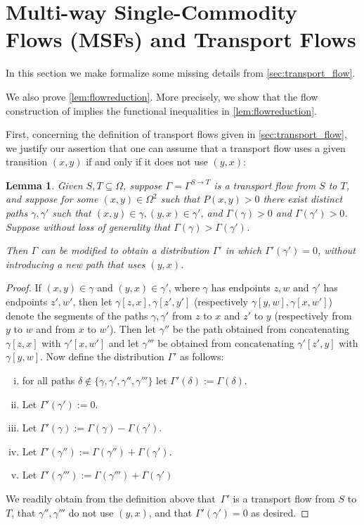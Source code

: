 \documentclass[a4paper, 12p]{article}
\numberwithin{equation}{section}
\newtheorem{lemma}[theorem]{Lemma}
\begin{document}
\printbibliography

\appendix

\section{Multi-way Single-Commodity Flows (MSFs) and Transport Flows}
\label{sec:msf}
In this section we make formalize some missing details from \cref{sec:transport_flow}.

We also prove \cref{lem:flowreduction}. More precisely, we show that the flow construction of \cite{eppstein2022improved} implies the functional inequalities in \cref{lem:flowreduction}.

First, concerning the definition of transport flows given in \cref{sec:transport_flow}, we justify our assertion that one can assume that a transport flow uses a given transition $(x, y)$ if and only if it does not use $(y, x)$:
\begin{lemma}
\label{lem:onedir}
Given $S, T \subseteq \Omega$, suppose $\Gamma = \Gamma^{S\rightarrow T}$ is a transport flow from $S$ to $T$, and suppose for some $(x, y) \in \Omega^2$ such that $P(x, y) > 0$ there exist distinct paths $\gamma, \gamma'$ such that $(x, y) \in \gamma, (y, x) \in \gamma'$, and $\Gamma(\gamma) > 0$ and $\Gamma(\gamma') > 0$. Suppose without loss of generality that $\Gamma(\gamma) > \Gamma(\gamma')$.

Then $\Gamma$ can be modified to obtain a distribution $\Gamma'$ in which $\Gamma'(\gamma') = 0$, without introducing a new path that uses $(y, x)$. 
\end{lemma}
\begin{proof}
If $(x, y) \in \gamma$ and $(y, x) \in \gamma'$, where $\gamma$ has endpoints $z,w$ and $\gamma'$ has endpoints $z',w'$, then let $\gamma[z, x], \gamma[z', y']$ (respectively $\gamma[y, w], \gamma[x, w']$) denote the segments of the paths $\gamma, \gamma'$ from $z$ to $x$ and $z'$ to $y$ (respectively from $y$ to $w$ and from $x$ to $w'$). Then let $\gamma''$ be the path obtained from concatenating $\gamma[z, x]$ with $\gamma'[x, w']$ and let $\gamma'''$ be obtained from concatenating $\gamma'[z', y]$ with $\gamma[y, w]$. Now define the distribution $\Gamma'$ as follows:
\begin{enumerate}[(i)]
    \item for all paths $\delta \notin \{\gamma, \gamma', \gamma'', \gamma'''\}$ let $\Gamma'(\delta) := \Gamma(\delta)$.
    \item Let $\Gamma'(\gamma') := 0$.
    \item Let $\Gamma'(\gamma) := \Gamma(\gamma) - \Gamma(\gamma')$.
    \item Let $\Gamma'(\gamma'') := \Gamma(\gamma'') + \Gamma(\gamma')$.
    \item Let $\Gamma'(\gamma''') := \Gamma(\gamma''') + \Gamma(\gamma')$
\end{enumerate}
We readily obtain from the definition above that~$\Gamma'$ is a transport flow from $S$ to $T$, that $\gamma'', \gamma'''$ do not use $(y, x)$, and that $\Gamma'(\gamma') = 0$ as desired.

\end{proof}
\end{document}
